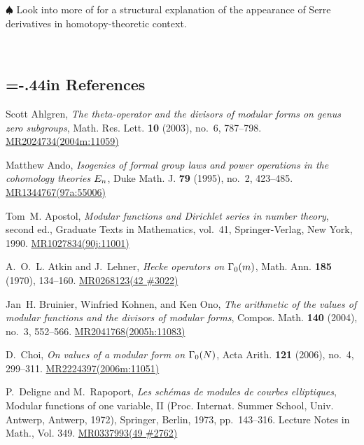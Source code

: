 \documentclass{rs}
\theoremstyle{definition}
\theoremstyle{remark}
\newcommand{\todo}{\spadesuit}
\renewcommand{\=}{\approx}
\renewcommand{\-}{\sim}
\newcommand{\wt}[1]{\textcolor{white}{#1} \!~}
\numberwithin{equation}{section}
\begin{document}
$\todo$ Look into more of \cite{padicprop} for a structural explanation of the appearance of Serre derivatives in homotopy-theoretic context.  



% 
% 

\vspace{.3in}
\renewcommand\refname{}
\newcommand{\AX}[1]{\href{http://arxiv.org/abs/#1}{arXiv:#1}}
\newcommand{\MRn}[2]{\href{http://www.ams.org/mathscinet-getitem?mr=#1}{MR#1#2}}
\wt{.}\vspace{-1.04in}
\begin{thebibliography}

\section*{\leftskip=-.44in References \vspace{.17in}}

Scott Ahlgren, \emph{The theta-operator and the divisors of modular forms on
  genus zero subgroups}, Math. Res. Lett. \textbf{10} (2003), no.~6,
  787--798. \MRn{2024734}{(2004m:11059)}

Matthew Ando, \emph{Isogenies of formal group laws and power operations in the
  cohomology theories {$E\sb n$}}, Duke Math. J. \textbf{79} (1995), no.~2,
  423--485. \MRn{1344767}{(97a:55006)}

Tom~M. Apostol, \emph{Modular functions and {D}irichlet series in number
  theory}, second ed., Graduate Texts in Mathematics, vol.~41, Springer-Verlag,
  New York, 1990. \MRn{1027834}{(90j:11001)}

A.~O.~L. Atkin and J.~Lehner, \emph{Hecke operators on {$\Gamma \sb{0}(m)$}},
  Math. Ann. \textbf{185} (1970), 134--160. \MRn{0268123}{(42 \#3022)}

Jan~H. Bruinier, Winfried Kohnen, and Ken Ono, \emph{The arithmetic of the
  values of modular functions and the divisors of modular forms}, Compos. Math.
  \textbf{140} (2004), no.~3, 552--566. \MRn{2041768}{(2005h:11083)}

D.~Choi, \emph{On values of a modular form on {$\Gamma\sb 0(N)$}}, Acta Arith.
  \textbf{121} (2006), no.~4, 299--311. \MRn{2224397}{(2006m:11051)}

P.~Deligne and M.~Rapoport, \emph{Les sch\'emas de modules de courbes
  elliptiques}, Modular functions of one variable, {II} ({P}roc. {I}nternat.
  {S}ummer {S}chool, {U}niv. {A}ntwerp, {A}ntwerp, 1972), Springer, Berlin,
  1973, pp.~143--316. Lecture Notes in Math., Vol. 349. \MRn{0337993}{(49
  \#2762)}


\end{thebibliography}
\end{document}
